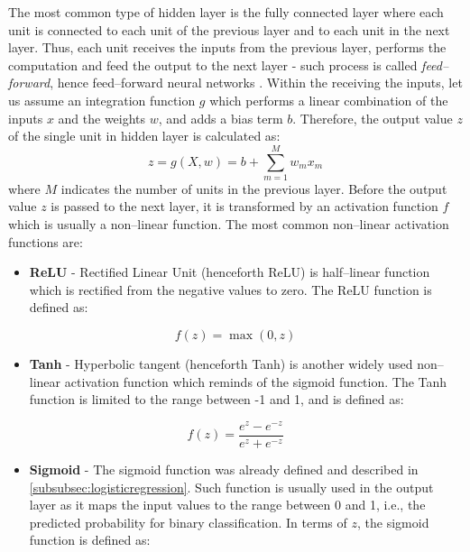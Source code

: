 The most common type of hidden layer is the fully connected layer where each unit is connected to each unit of the previous layer and to each unit in the next layer.
Thus, each unit receives the inputs from the previous layer, performs the computation and feed the output to the next layer - such process is called \textit{feed--forward}, hence feed--forward neural networks \citep{charu2018neural}.
Within the receiving the inputs, let us assume an integration function $g$ which performs a linear combination of the inputs $x$ and the weights $w$, and adds a bias term $b$.
Therefore, the output value $z$ of the single unit in hidden layer is calculated as:
\begin{equation}
    z = g\left(X,w\right)= b + \sum_{m=1}^{M} w_m x_m
\end{equation}
where $M$ indicates the number of units in the previous layer.
Before the output value $z$ is passed to the next layer, it is transformed by an activation function $f$ which is usually a non--linear function. The most common non--linear activation functions are:
\begin{itemize}\setlength\itemsep{0cm}
\item \textbf{ReLU} - Rectified Linear Unit (henceforth ReLU) is half--linear function which is rectified from the negative values to zero. The ReLU function is defined as:
\end{itemize}
\begin{equation}
    f(z) = \max(0,z)
\end{equation}
\begin{itemize}\setlength\itemsep{0cm}
    \item \textbf{Tanh} - Hyperbolic tangent (henceforth Tanh) is another widely used non--linear activation function which reminds of the sigmoid function. The Tanh function is limited to the range between -1 and 1, and is defined as:
    \end{itemize}
\begin{equation}
    f(z) = \frac{e^z - e^{-z}}{e^z + e^{-z}}
\end{equation}
\begin{itemize}\setlength\itemsep{0cm}
    \item \textbf{Sigmoid} - The sigmoid function was already defined and described in \autoref{subsubsec:logisticregression}. Such function is usually used in the output layer as it maps the input values to the range between 0 and 1, i.e., the predicted probability for binary classification. In terms of $z$, the sigmoid function is defined as:
    \end{itemize}
